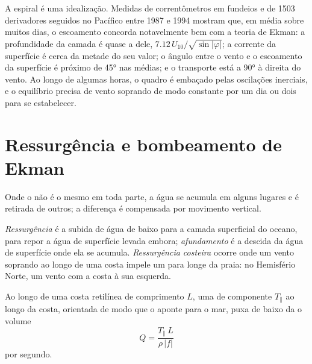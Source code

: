 A espiral é uma idealização. Medidas de correntômetros em fundeios e de
1503 derivadores seguidos no Pacífico entre 1987 e 1994 mostram que, em média sobre
muitos dias, o escoamento concorda notavelmente bem com a teoria de Ekman: a profundidade da
camada é quase a dele, $7.12\,U_{10}/\sqrt{\sin|\varphi|}$; a corrente da superfície é
cerca da metade do seu valor; o ângulo entre o vento e o escoamento da superfície é próximo de
\ang{45} nas  médias; e o transporte está a \ang{90} à direita do vento.
Ao longo de algumas horas, o quadro é embaçado pelas oscilações inerciais, e o equilíbrio
precisa de vento soprando de modo constante por um dia ou dois para se estabelecer.

\section{Ressurgência e bombeamento de Ekman}\label{sec:b1:ocean-circulation:upwelling}

Onde o  não é o mesmo em toda parte, a água se acumula em alguns lugares
e é retirada de outros; a diferença é compensada por movimento vertical.

\begin{definition}\label{def:b1:ocean-circulation:upwelling}
\emph{Ressurgência} é a subida de água de baixo para a camada
superficial do oceano, para repor a água de superfície levada embora; \emph{afundamento}%
 é a descida da água de superfície onde ela se acumula.
\emph{Ressurgência costeira} ocorre onde um vento soprando ao longo
de uma costa impele um  para longe da praia: no Hemisfério Norte,
um vento com a costa à sua esquerda.
\end{definition}

\begin{proposition}\label{prop:b1:ocean-circulation:coastal}
Ao longo de uma costa retilínea de comprimento $L$, uma  de componente $T_\parallel$
ao longo da costa, orientada de modo que o  aponte para o mar, puxa de
baixo da  o volume
\[
  Q = \frac{T_\parallel\,L}{\rho\,|f|}
\]
por segundo.
\end{proposition}


